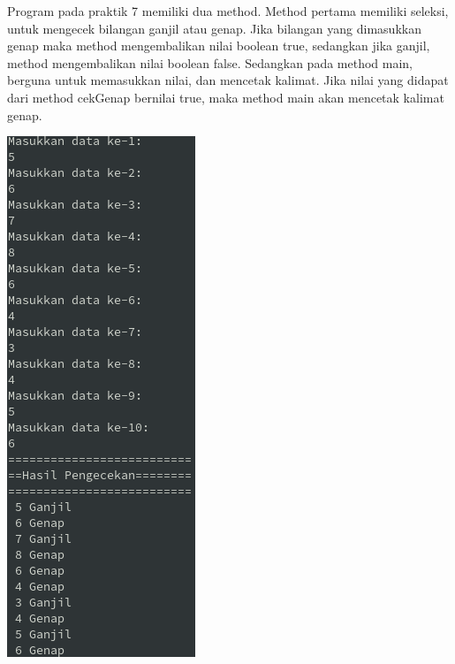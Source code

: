 \documentclass[a4paper,12pt]{article}
\begin{document}
Program pada praktik 7 memiliki dua method. Method pertama memiliki seleksi, untuk mengecek bilangan ganjil atau genap. Jika
bilangan yang dimasukkan genap maka method mengembalikan nilai boolean true, sedangkan jika ganjil, method mengembalikan
nilai boolean false. Sedangkan pada method main, berguna untuk memasukkan nilai, dan mencetak kalimat. Jika nilai yang
didapat dari method cekGenap bernilai true, maka method main akan mencetak kalimat genap.
\begin{center}
    \includegraphics[scale=1]{7.png} 
\end{center}

\newpage
\end{document}
